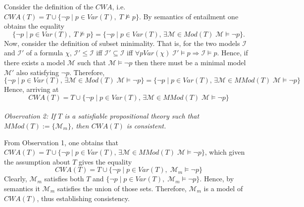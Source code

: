 \documentclass[11pt,a4paper]{article}
\newcommand{\nmodels}{\not\models}
\begin{document}
\begin{enumerate}
Consider the definition of the $\mathit{CWA}$, i.e. $\mathit{CWA}(T)= T \cup \{ \neg p \mid p \in \mathit{Var}(T) , \;T \nmodels p \}$.
By semantics of entailment one obtains the equality 
\begin{equation*}
 \{ \neg p \mid p \in \mathit{Var}(T), \;T \nmodels p \} = \{ \neg p \mid p \in \mathit{Var}(T), \, \exists \mathcal{M} \in \mathit{Mod}(T) \; \mathcal{M} \models \neg p \}.
\end{equation*}
Now, consider the definition of subset minimality. That is, for the two models $\mathcal{I}$ and $\mathcal{I}'$ of a formula $\chi$, $\mathcal{I}' \leq \mathcal{I}$ iff $\mathcal{I}' \subseteq \mathcal{I}$ iff $\forall p \mathit{Var}(\chi) \; \mathcal{I}' \models p \Rightarrow  \mathcal{I} \models p$. Hence, if there exists a model $\mathcal{M}$ such that $\mathcal{M} \models \neg p$ then there must be a minimal model $\mathcal{M}'$ also satisfying $\neg p$. Therefore, 
\begin{equation*}
\{ \neg p \mid p \in \mathit{Var}(T), \, \exists \mathcal{M} \in \mathit{Mod}(T) \; \mathcal{M} \models \neg p \} = \{ \neg p \mid p \in \mathit{Var}(T), \, \exists \mathcal{M} \in \mathit{MMod}(T) \; \mathcal{M} \models \neg p \}
\end{equation*}
Hence, arriving at
\begin{equation*}
\mathit{CWA}(T)= T \cup \{ \neg p \mid p \in \mathit{Var}(T), \, \exists \mathcal{M} \in \mathit{MMod}(T) \; \mathcal{M} \models \neg p \}
\end{equation*} \\

\emph{Observation 2: If $T$ is a satisfiable propositional theory such that $\mathit{MMod}(T):= \{\mathcal{M}_m\}$, then $CWA(T)$ is consistent.}

From Observation 1, one obtains that $\mathit{CWA}(T)= T \cup \{ \neg p \mid p \in \mathit{Var}(T), \, \exists \mathcal{M} \in \mathit{MMod}(T) \; \mathcal{M} \models \neg p \}$, which given the assumption about $T$ gives the equality
\begin{equation*}
\mathit{CWA}(T)= T \cup \{ \neg p \mid p \in \mathit{Var}(T), \; \mathcal{M}_m \models \neg p \}
\end{equation*} 
Clearly, $\mathcal{M}_m$ satisfies both $T$ and $ \{ \neg p \mid p \in \mathit{Var}(T),  \; \mathcal{M}_m \models \neg p \}$. Hence, by semantics it $\mathcal{M}_m$ satisfies the union of those sets. Therefore, $\mathcal{M}_m$ is a model of $\mathit{CWA}(T)$, thus establishing consistency. \\



\end{enumerate}
\end{document}
